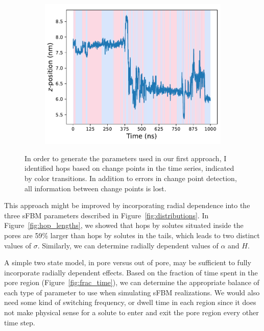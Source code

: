 \documentclass{article}
\begin{document}
  \begin{figure}
  \centering
  \vspace{-0.5cm}
  \begin{subfigure}{\linewidth}
  \includegraphics[width=\linewidth]{breakpoints.pdf}
  \caption{}\label{fig:breakpoints}
  \end{subfigure}
  \caption{In order to generate the parameters used in our first approach,
  I identified hops based on change points in the time series, indicated by
  color transitions. In addition to errors in change point detection, all 
  information between change points is lost.}\label{fig:ruptures}
  \vspace{-.5cm}
  \end{figure}  
  
  This approach might be improved by incorporating radial dependence into
  the three sFBM parameters described in Figure~\ref{fig:distributions}. 
  In Figure~\ref{fig:hop_lengths}, we showed that hops by solutes situated 
  inside the pores are 59\% larger than hops by solutes in the tails, which 
  leads to two distinct values of $\sigma$. Similarly, we can determine 
  radially dependent values of $\alpha$ and $H$. 
  
  A simple two state model, in pore versus out of pore, may be sufficient to 
  fully incorporate radially dependent effects. Based on the fraction of time 
  spent in the pore region (Figure~\ref{fig:frac_time}), we can determine
  the appropriate balance of each type of parameter to use when simulating sFBM
  realizations. We would also need some kind of switching frequency, or dwell
  time in each region since it does not make physical sense for a solute to 
  enter and exit the pore region every other time step.
  
\end{document}
